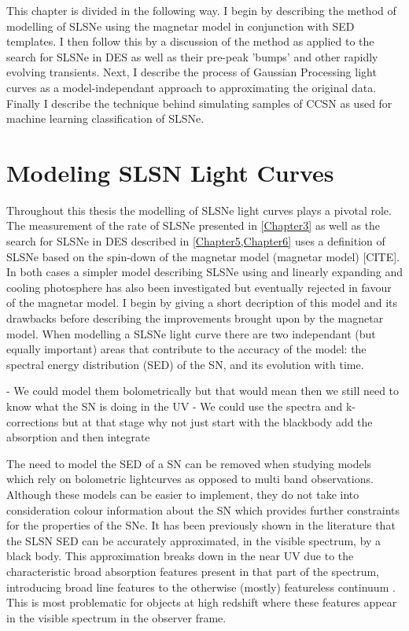 This chapter is divided in the following way. I begin by describing the method of modelling of SLSNe using the magnetar model in conjunction with SED templates. I then follow this by a discussion of the method as applied to the search for SLSNe in DES as well as their pre-peak 'bumps' and other rapidly evolving transients. Next, I describe the process of Gaussian Processing light curves as a model-independant approach to approximating the original data. Finally I describe the technique behind simulating samples of CCSN as used for machine learning classification of SLSNe.

\section{Modeling SLSN Light Curves} \label{sec:SLAP}
Throughout this thesis the modelling of SLSNe light curves plays a pivotal role. The measurement of the rate of SLSNe presented in \cref{Chapter3} as well as the search for SLSNe in DES described in \cref{Chapter5,Chapter6} uses a definition of SLSNe based on the spin-down of the magnetar model (magnetar model) [CITE]. In both cases a simpler model describing SLSNe using and linearly expanding and cooling photosphere has also been investigated but eventually rejected in favour of the magnetar model. I begin by giving a short decription of this model and its drawbacks before describing the improvements brought upon by the magnetar model. When modelling a SLSNe light curve there are two independant (but equally important) areas that contribute to the accuracy of the model: the spectral energy distribution (SED) of the SN, and its evolution with time.

- We could model them bolometrically but that would mean then we still need to know what the SN is doing in the UV
- We could use the spectra and k-corrections but at that stage why not just start with the blackbody add the absorption and then integrate

The need to model the SED of a SN can be removed when studying models which rely on bolometric lightcurves as opposed to multi band observations. Although these models can be easier to implement, they do not take into consideration colour information about the SN which provides further constraints for the properties of the SNe. It has been previously shown in the literature \citep{2011ApJ...743..114C,2013ApJ...779...98H,2015MNRAS.449.1215P,2014ApJ...797...24V} that the SLSN SED can be accurately approximated, in the visible spectrum, by a black body. This approximation breaks down in the near UV due to the characteristic broad absorption features present in that part of the spectrum, introducing broad line features to the otherwise (mostly) featureless continuum \cite{Mazzalli:2015,2012Sci...337..927G,2011Natur.474..487Q}. This is most problematic for objects at high redshift where these features appear in the visible spectrum in the observer frame.


